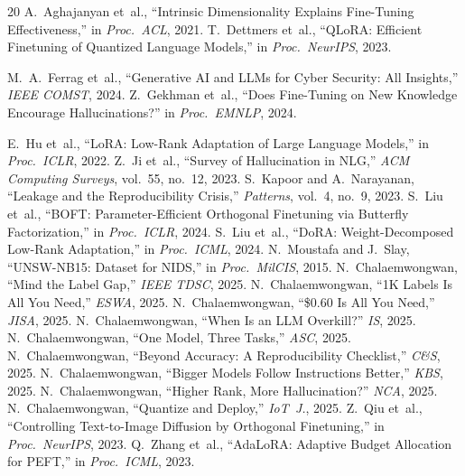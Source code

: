 \documentclass[review,3p]{elsarticle}
\begin{document}
\begin{thebibliography}{20}
 A.~Aghajanyan et~al., ``Intrinsic Dimensionality Explains Fine-Tuning Effectiveness,'' in \emph{Proc.\ ACL}, 2021.
 T.~Dettmers et~al., ``QLoRA: Efficient Finetuning of Quantized Language Models,'' in \emph{Proc.\ NeurIPS}, 2023.

 M.~A.~Ferrag et~al., ``Generative AI and LLMs for Cyber Security: All Insights,'' \emph{IEEE COMST}, 2024.
 Z.~Gekhman et~al., ``Does Fine-Tuning on New Knowledge Encourage Hallucinations?'' in \emph{Proc.\ EMNLP}, 2024.

 E.~Hu et~al., ``LoRA: Low-Rank Adaptation of Large Language Models,'' in \emph{Proc.\ ICLR}, 2022.
 Z.~Ji et~al., ``Survey of Hallucination in NLG,'' \emph{ACM Computing Surveys}, vol.~55, no.~12, 2023.
 S.~Kapoor and A.~Narayanan, ``Leakage and the Reproducibility Crisis,'' \emph{Patterns}, vol.~4, no.~9, 2023.
 S.~Liu et~al., ``BOFT: Parameter-Efficient Orthogonal Finetuning via Butterfly Factorization,'' in \emph{Proc.\ ICLR}, 2024.
 S.~Liu et~al., ``DoRA: Weight-Decomposed Low-Rank Adaptation,'' in \emph{Proc.\ ICML}, 2024.
 N.~Moustafa and J.~Slay, ``UNSW-NB15: Dataset for NIDS,'' in \emph{Proc.\ MilCIS}, 2015.
 N.~Chalaemwongwan, ``Mind the Label Gap,'' \emph{IEEE TDSC}, 2025.
 N.~Chalaemwongwan, ``1K Labels Is All You Need,'' \emph{ESWA}, 2025.
 N.~Chalaemwongwan, ``\$0.60 Is All You Need,'' \emph{JISA}, 2025.
 N.~Chalaemwongwan, ``When Is an LLM Overkill?'' \emph{IS}, 2025.
 N.~Chalaemwongwan, ``One Model, Three Tasks,'' \emph{ASC}, 2025.
 N.~Chalaemwongwan, ``Beyond Accuracy: A Reproducibility Checklist,'' \emph{C\&S}, 2025.
 N.~Chalaemwongwan, ``Bigger Models Follow Instructions Better,'' \emph{KBS}, 2025.
 N.~Chalaemwongwan, ``Higher Rank, More Hallucination?'' \emph{NCA}, 2025.
 N.~Chalaemwongwan, ``Quantize and Deploy,'' \emph{IoT~J.}, 2025.
 Z.~Qiu et~al., ``Controlling Text-to-Image Diffusion by Orthogonal Finetuning,'' in \emph{Proc.\ NeurIPS}, 2023.
 Q.~Zhang et~al., ``AdaLoRA: Adaptive Budget Allocation for PEFT,'' in \emph{Proc.\ ICML}, 2023.
\end{thebibliography}
\end{document}
